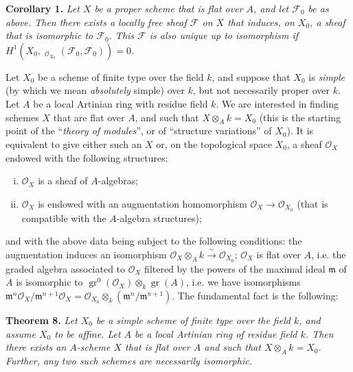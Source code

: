 \documentclass{article}
\newenvironment{itenv}[1]
  {\phantomsection\par\medskip\noindent\textbf{#1.}\itshape}
  {\par\medskip}
\newcommand{\scr}[1]{{\mathscr{#1}}}
\newcommand{\fk}{\mathfrak}
\DeclareMathOperator{\Hom}{Hom}
\DeclareMathOperator{\shHom}{\underline{\Hom}}
\DeclareMathOperator{\gr}{gr}
\newcommand{\oldpage}[1]{\marginpar{\footnotesize$\Big\vert$ \textit{p.~#1}}}
\begin{document}
\begin{itenv}{Corollary 1}
\label{proposition3corollary1}
  Let $X$ be a proper scheme that is flat over $A$, and let $\scr{F}_0$ be as above.
  Then there exists a locally free sheaf $\scr{F}$ on $X$ that induces, on $X_0$, a sheaf that is isomorphic to $\scr{F}_0$.
  This $\scr{F}$ is also unique up to isomorphism if $H^1(X_0,\shHom_{\scr{O}_{X_0}}(\scr{F}_0,\scr{F}_0))=0$.
\end{itenv}

Let $X_0$ be a scheme of finite type over the field $k$, and suppose that $X_0$ is \emph{simple} (by which we mean \emph{absolutely} simple) over $k$, but not necessarily proper over $k$.
Let $A$ be a local Artinian ring with residue field $k$.
We are interested in finding schemes $X$ that are flat over $A$, and such that $X\otimes_A k=X_0$ (this is the starting point of the ``\emph{theory of modules}'', or of ``structure variations''
\oldpage{182-12}
of $X_0$).
It is equivalent to give either such an $X$ or, on the topological space $X_0$, a sheaf $\scr{O}_X$ endowed with the following structures:
\begin{enumerate}[i.]
  \item $\scr{O}_X$ is a sheaf of $A$-algebras;
  \item $\scr{O}_X$ is endowed with an augmentation homomorphism $\scr{O}_X\to\scr{O}_{X_0}$ (that is compatible with the $A$-algebra structures);
\end{enumerate}
and with the above data being subject to the following conditions: the augmentation induces an isomorphism $\scr{O}_X\otimes_A k\xrightarrow{\sim}\scr{O}_{X_0}$;
$\scr{O}_X$ is flat over $A$, i.e. the graded algebra associated to $\scr{O}_X$ filtered by the powers of the maximal ideal $\fk{m}$ of $A$ is isomorphic to $\gr^0(\scr{O}_X)\otimes_k\gr(A)$, i.e. we have isomorphisms $\fk{m}^n\scr{O}_X/\fk{m}^{n+1}\scr{O}_X = \scr{O}_{X_0}\otimes_k(\fk{m}^n/\fk{m}^{n+1})$.
The fundamental fact is the following:

\begin{itenv}{Theorem 8}
\label{theorem8}
  Let $X_0$ be a simple scheme of finite type over the field $k$, and assume $X_0$ to be affine.
  Let $A$ be a local Artinian ring of residue field $k$.
  Then there exists an $A$-scheme $X$ that is flat over $A$ and such that $X\otimes_A k=X_0$.
  Further, any two such schemes are necessarily isomorphic.
\end{itenv}
\end{document}
